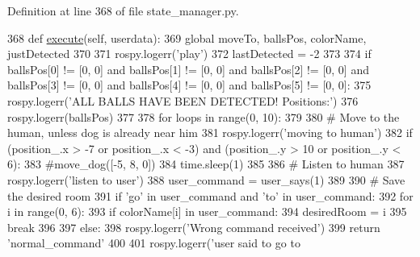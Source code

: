 Definition at line 368 of file state\+\_\+manager.\+py.


\begin{DoxyCode}
368     \textcolor{keyword}{def }\hyperlink{classstate__manager_1_1MIRO__Play_a781db4be4fcbb313c46097a8fdf06275}{execute}(self, userdata):
369         \textcolor{keyword}{global} moveTo, ballsPos, colorName, justDetected
370 
371         rospy.logerr(\textcolor{stringliteral}{'play'})
372         lastDetected = -2
373 
374         \textcolor{keywordflow}{if} ballsPos[0] != [0, 0] \textcolor{keywordflow}{and} ballsPos[1] != [0, 0] \textcolor{keywordflow}{and} ballsPos[2] != [0, 0] \textcolor{keywordflow}{and} ballsPos[3] != [0,
       0] \textcolor{keywordflow}{and} ballsPos[4] != [0, 0] \textcolor{keywordflow}{and} ballsPos[5] != [0, 0]:
375             rospy.logerr(\textcolor{stringliteral}{'ALL BALLS HAVE BEEN DETECTED! Positions:'})
376             rospy.logerr(ballsPos)
377 
378         \textcolor{keywordflow}{for} loops \textcolor{keywordflow}{in} range(0, 10):
379 
380             \textcolor{comment}{# Move to the human, unless dog is already near him}
381             rospy.logerr(\textcolor{stringliteral}{'moving to human'})
382             \textcolor{keywordflow}{if} (position\_.x > -7 \textcolor{keywordflow}{or} position\_.x < -3) \textcolor{keywordflow}{and} (position\_.y > 10 \textcolor{keywordflow}{or} position\_.y < 6):
383                 \textcolor{comment}{#move\_dog([-5, 8, 0])}
384                 time.sleep(1)
385 
386                 \textcolor{comment}{# Listen to human}
387             rospy.logerr(\textcolor{stringliteral}{'listen to user'})
388             user\_command = user\_says(1)
389 
390             \textcolor{comment}{# Save the desired room}
391             \textcolor{keywordflow}{if} \textcolor{stringliteral}{'go'} \textcolor{keywordflow}{in} user\_command \textcolor{keywordflow}{and} \textcolor{stringliteral}{'to'} \textcolor{keywordflow}{in} user\_command:
392                 \textcolor{keywordflow}{for} i \textcolor{keywordflow}{in} range(0, 6):
393                     \textcolor{keywordflow}{if} colorName[i] \textcolor{keywordflow}{in} user\_command:
394                         desiredRoom = i
395                         \textcolor{keywordflow}{break}
396 
397             \textcolor{keywordflow}{else}:
398                 rospy.logerr(\textcolor{stringliteral}{'Wrong command received'})
399                 \textcolor{keywordflow}{return} \textcolor{stringliteral}{'normal\_command'}
400 
401             rospy.logerr(\textcolor{stringliteral}{'user said to go to %
}
\end{DoxyCode}

